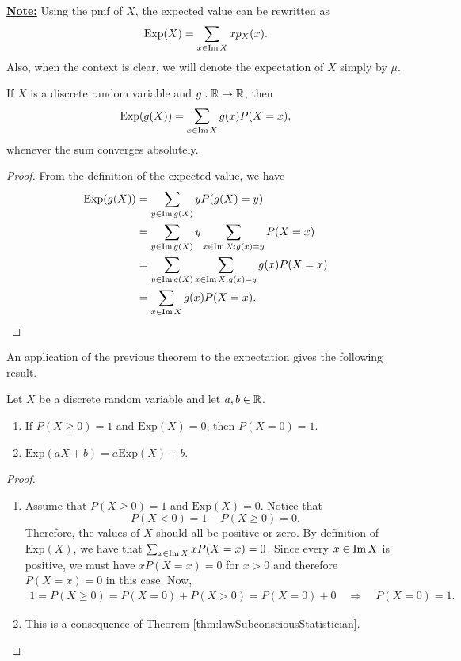 \underline{\textbf{Note:}} Using the pmf of $X$, the expected value can be rewritten as
    \begin{align*}
    \mathrm{Exp} (X) = \sum_{x \in \operatorname{Im} X} x p_X (x) .
    \end{align*} 
Also, when the context is clear, we will denote the expectation of $X$ simply by $\mu$.

\vspace*{16pt}

\begin{theorem}\label{thm:lawSubconsciousStatistician}
If $X$ is a discrete random variable and $g : \mathbb{R} \rightarrow \mathbb{R}$, then
    \begin{align*}
    \mathrm{Exp} (g (X)) = \sum_{x \in \operatorname{Im} X} g (x) P (X = x) ,
    \end{align*} 
whenever the sum converges absolutely.
\end{theorem}
\begin{proof}
From the definition of the expected value, we have
    \begin{align*}
    \mathrm{Exp} (g(X)) &= \sum_{y \in \operatorname{Im} g (X)} y P (g (X) = y) \\
    &= \sum_{y \in \operatorname{Im} g (X)} y \sum_{x \in \operatorname{Im} X : g(x) = y} P (X = x) \\
    &= \sum_{y \in \operatorname{Im} g (X)} \sum_{x \in \operatorname{Im} X : g(x) = y} g (x) P (X = x) \\
    &= \sum_{x \in \operatorname{Im} X} g (x) P (X = x) . \qedhere
    \end{align*}
\end{proof}

An application of the previous theorem to the expectation gives the following result.

\begin{corollary}
Let $X$ be a discrete random variable and let $a, b \in \mathbb{R}$.
\begin{enumerate}[label=\alph*)]
\item If $P (X \geq 0) = 1$ and $\mathrm{Exp} (X) = 0$, then $P (X = 0) = 1$.
\item $\mathrm{Exp} (aX + b) = a \mathrm{Exp} (X) + b$.
\end{enumerate}
\end{corollary}
\begin{proof}
\begin{enumerate}[label=\alph*)]
\item Assume that $P (X \geq 0 ) = 1$ and $\mathrm{Exp} (X) = 0$. Notice that 
    $$
    P (X < 0) = 1 - P (X \geq 0) = 0.
    $$
Therefore, the values of $X$ should all be positive or zero. By definition of $\mathrm{Exp} (X)$, we have that $\sum_{x \in \operatorname{Im} X} x P (X = x) = 0$. Since every $x \in \operatorname{Im} X$ is positive, we must have $x P (X = x) = 0$ for $x > 0$ and therefore $P (X = x) = 0$ in this case. Now, 
    \begin{align*}
    1 = P (X \geq 0) = P (X = 0) + P (X > 0) = P (X = 0) + 0 \quad \Rightarrow \quad P (X = 0) = 1 .
    \end{align*} 
\item This is a consequence of Theorem \ref{thm:lawSubconsciousStatistician}.\qedhere
\end{enumerate}
\end{proof}

